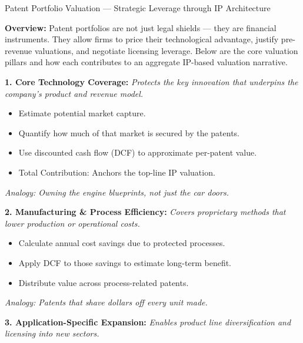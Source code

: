 \begin{TechnicalSidebar}{Patent Portfolio Valuation --- Strategic Leverage through IP Architecture}

    \textbf{Overview:}  
    Patent portfolios are not just legal shields — they are financial instruments. They allow firms to price 
    their technological advantage, justify pre-revenue valuations, and negotiate licensing leverage. Below 
    are the core valuation pillars and how each contributes to an aggregate IP-based valuation narrative.
    
    \medskip
    
    \textbf{1. Core Technology Coverage:}  
    \textit{Protects the key innovation that underpins the company’s product and revenue model.}

    \medskip

    \begin{itemize}
      \item Estimate potential market capture.
      \item Quantify how much of that market is secured by the patents.
      \item Use discounted cash flow (DCF) to approximate per-patent value.
      \item Total Contribution: Anchors the top-line IP valuation.
    \end{itemize}

    \medskip


    \textit{Analogy: Owning the engine blueprints, not just the car doors.}
    
    \medskip
    
    \textbf{2. Manufacturing \& Process Efficiency:}  
    \textit{Covers proprietary methods that lower production or operational costs.}

    \medskip
    \begin{itemize}
      \item Calculate annual cost savings due to protected processes.
      \item Apply DCF to those savings to estimate long-term benefit.
      \item Distribute value across process-related patents.
    \end{itemize}

    \medskip

    \textit{Analogy: Patents that shave dollars off every unit made.}
    
    \medskip
    
    \textbf{3. Application-Specific Expansion:}  
    \textit{Enables product line diversification and licensing into new sectors.}


\end{TechnicalSidebar}
